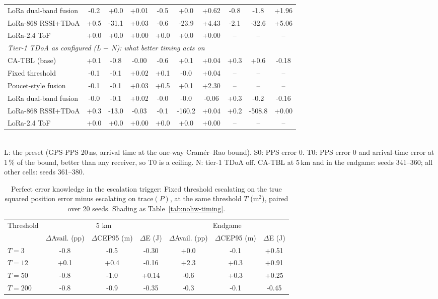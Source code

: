 \begin{table}[t]
\begin{tabular}{lccccccccc}
LoRa dual-band fusion & -0.2 & +0.0 & +0.01 & -0.5 & +0.0 & \cellcolor{unf}+0.62 & -0.8 & \cellcolor{fav}-1.8 & \cellcolor{unf}+1.96 \\
LoRa-868 RSSI+TDoA & +0.5 & -31.1 & +0.03 & -0.6 & -23.9 & \cellcolor{unf}+4.43 & \cellcolor{unf}-2.1 & -32.6 & \cellcolor{unf}+5.06 \\
LoRa-2.4 ToF & +0.0 & +0.0 & +0.00 & +0.0 & +0.0 & +0.00 & -- & -- & -- \\
\midrule
\multicolumn{10}{l}{\emph{Tier-1 TDoA as configured (L $-$ N): what better timing acts on}} \\
CA-TBL (base) & +0.1 & -0.8 & -0.00 & -0.6 & \cellcolor{unf}+0.1 & +0.04 & +0.3 & +0.6 & -0.18 \\
Fixed threshold & -0.1 & -0.1 & +0.02 & +0.1 & -0.0 & +0.04 & -- & -- & -- \\
Poucet-style fusion & -0.1 & -0.1 & +0.03 & +0.5 & +0.1 & \cellcolor{unf}+2.30 & -- & -- & -- \\
LoRa dual-band fusion & -0.0 & -0.1 & +0.02 & -0.0 & -0.0 & -0.06 & +0.3 & -0.2 & -0.16 \\
LoRa-868 RSSI+TDoA & +0.3 & -13.0 & -0.03 & -0.1 & \cellcolor{fav}-160.2 & +0.04 & +0.2 & \cellcolor{fav}-508.8 & +0.00 \\
LoRa-2.4 ToF & +0.0 & +0.0 & +0.00 & +0.0 & +0.0 & +0.00 & -- & -- & -- \\
\bottomrule
\end{tabular}
\\[2pt]\footnotesize L: the preset (GPS-PPS 20\,ns, arrival time at the one-way Cram\'er--Rao bound). S0: PPS error 0. T0: PPS error 0 and arrival-time error at 1\,\% of the bound, better than any receiver, so T0 is a ceiling. N: tier-1 TDoA off. CA-TBL at 5\,km and in the endgame: seeds 341--360; all other cells: seeds 361--380.
\end{table}

\begin{table}[t]
\centering
\small
\setlength{\tabcolsep}{4pt}
\caption{Perfect error knowledge in the escalation trigger: Fixed threshold escalating on the true squared position error minus escalating on $\mathrm{trace}(P)$, at the same threshold $T$ (m$^2$), paired over 20 seeds. Shading as Table~\ref{tab:nohw-timing}.}
\label{tab:nohw-oracle}
\begin{tabular}{lcccccc}
\toprule
Threshold & \multicolumn{3}{c}{5 km} & \multicolumn{3}{c}{Endgame} \\
\cmidrule(lr){2-4}\cmidrule(lr){5-7}
 & $\Delta$Avail. (pp) & $\Delta$CEP95 (m) & $\Delta$E (J) & $\Delta$Avail. (pp) & $\Delta$CEP95 (m) & $\Delta$E (J) \\
\midrule
$T = 3$ & -0.8 & -0.5 & -0.30 & +0.0 & -0.1 & +0.51 \\
$T = 12$ & +0.1 & +0.4 & -0.16 & \cellcolor{fav}+2.3 & +0.3 & \cellcolor{unf}+0.91 \\
$T = 50$ & -0.8 & -1.0 & +0.14 & -0.6 & +0.3 & +0.25 \\
$T = 200$ & -0.8 & -0.9 & -0.35 & -0.3 & -0.1 & -0.45 \\
\bottomrule
\end{tabular}
\end{table}

